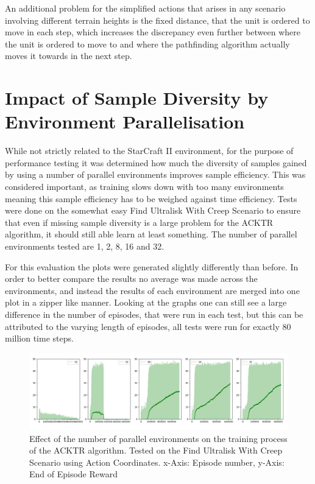 An additional problem for the simplified actions that arises in any scenario involving different terrain heights is the fixed distance, that the unit is ordered to move in each step, which increases the discrepancy even further between where the unit is ordered to move to and where the pathfinding algorithm actually moves it towards in the next step.


\section{Impact of Sample Diversity by Environment Parallelisation}
While not strictly related to the StarCraft II environment, for the purpose of performance testing it was determined how much the diversity of samples gained by using a number of parallel environments improves sample efficiency. This was considered important, as training slows down with too many environments meaning this sample efficiency has to be weighed against time efficiency. Tests were done on the somewhat easy Find Ultralisk With Creep Scenario to ensure that even if missing sample diversity is a large problem for the ACKTR algorithm, it should still able learn at least something. The number of parallel environments tested are 1, 2, 8, 16 and 32.

For this evaluation the plots were generated slightly differently than before. In order to better compare the results no average was made across the environments, and instead the results of each environment are merged into one plot in a zipper like manner. Looking at the graphs one can still see a large difference in the number of episodes, that were run in each test, but this can be attributed to the varying length of episodes, all tests were run for exactly 80 million time steps.

\begin{figure}[htb]
  \centering
      \includegraphics[width=1\textwidth]{Figures/plots/acktr_diversity.png}
  \caption{Effect of the number of parallel environments on the training process of the ACKTR algorithm. Tested on the Find Ultralisk With Creep Scenario using Action Coordinates. x-Axis: Episode number, y-Axis: End of Episode Reward}
  \label{fig:acktr_diverse}
\end{figure}

